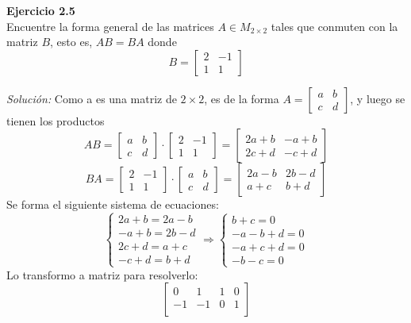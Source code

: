 \documentclass{article}
\newenvironment{problem}[2][Ejercicio]
    { \begin{mdframed}[backgroundcolor=gray!20] \textbf{#1 #2} \\}
    {  \end{mdframed}}
\newenvironment{solution}
    {\textit{Solución:}}
    {}
\begin{document}
\begin{problem}{2.5}
    Encuentre la forma general de las matrices $A \in M_{2\times 2}$ tales que conmuten con la matriz $B$, esto es, $AB = BA$ donde
\[
B = \begin{bmatrix}
2 & -1 \\
1 & 1
\end{bmatrix}
\]
\end{problem}
\begin{solution}
    Como a es una matriz de $2 \times 2$, es de la forma $A = \begin{bmatrix} a & b \\ c & d \end{bmatrix}$, y luego se tienen los productos
\[
AB = 
\begin{bmatrix} a & b \\ c & d \end{bmatrix}\cdot
\begin{bmatrix} 2 & -1 \\ 1 & 1 \end{bmatrix} = 
\begin{bmatrix} 2a+b & -a+b \\ 2c+d & -c+d \end{bmatrix}
\]\[
BA = 
\begin{bmatrix} 2 & -1 \\ 1 & 1 \end{bmatrix} \cdot
\begin{bmatrix} a & b \\ c & d \end{bmatrix} = 
\begin{bmatrix} 2a-b & 2b-d \\ a+c & b+d \end{bmatrix}
\]
Se forma el siguiente sistema de ecuaciones:
\[
\begin{cases}
2a + b = 2a-b \\
-a+b = 2b-d \\
2c+d = a+c \\
-c+d = b+d
\end{cases} \Rightarrow
\begin{cases}
b+c = 0 \\
-a-b+d = 0 \\
-a+c+d = 0 \\
-b-c = 0
\end{cases}
\]
Lo transformo a matriz para resolverlo:
\[
\begin{bmatrix}
0 & 1 & 1 & 0 \\
-1 & -1 & 0 & 1 \\

\end{bmatrix}\]
\end{solution}
\end{document}
